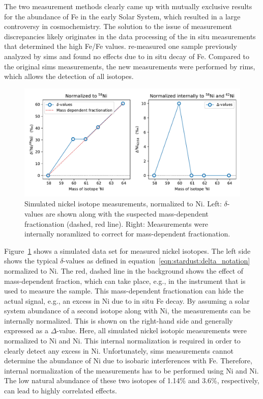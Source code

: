 The two measurement methods clearly came up with mutually exclusive results for the abundance of Fe in the early Solar System, which resulted in a large controversy in cosmochemistry. The solution to the issue of measurement discrepancies likely originates in the data processing of the in situ measurements that determined the high Fe/Fe values. \citet{trappitsch18} re-measured one sample previously analyzed by \ac{sims} and found no effects due to in situ decay of Fe. Compared to the original \ac{sims} measurements, the new measurements were performed by \ac{rims}, which allows the detection of all isotopes. 

\begin{figure}[tb]
    \centering
    \includegraphics[width=\textwidth]{graphics/solar_system_slrs/fe60_int_norm}
    \caption{Simulated nickel isotope measurements, normalized to Ni. Left: $\delta$-values are shown along with the suspected mass-dependent fractionation (dashed, red line). Right: Measurements were internally noramlized to correct for mass-dependent fractionation.}
    \label{fig:solar_system_slrs:fe60_int_norm}
\end{figure}
Figure~\ref{fig:solar_system_slrs:fe60_int_norm} shows a simulated data set for measured nickel isotopes. The left side shows the typical $\delta$-values as defined in equation~\eqref{eqn:stardust:delta_notation} normalized to Ni. The red, dashed line in the background shows the effect of mass-dependent fraction, which can take place, e.g., in the instrument that is used to measure the sample. This mass-dependent fractionation can hide the actual signal, e.g., an excess in Ni due to in situ Fe decay. By assuming a solar system abundance of a second isotope along with Ni, the measurements can be internally normalized. This is shown on the right-hand side and generally expressed as a $\Delta$-value. Here, all simulated nickel isotopic measurements were normalized to Ni and Ni. This internal normalization is required in order to clearly detect any excess in Ni. Unfortunately, \ac{sims} measurements cannot determine the abundance of Ni due to isobaric interferences with Fe. Therefore, internal normalization of the measurements has to be performed using Ni and Ni. The low natural abundance of these two isotopes of 1.14\% and 3.6\%, respectively, can lead to highly correlated effects.


